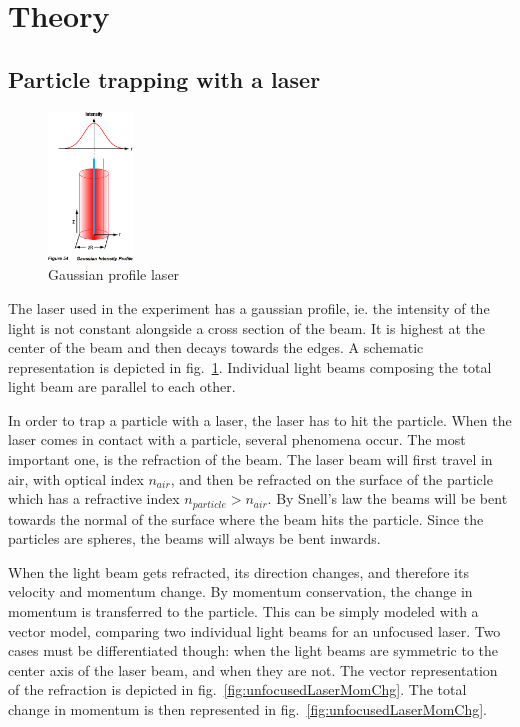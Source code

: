 \documentclass{article}
\begin{document}
\section{Theory}

\subsection{Particle trapping with a laser}

\begin{figure}
    \centering
    \includegraphics[width=0.2\textwidth]{gaussianLaser.png}
    \caption{Gaussian profile laser}
    \label{fig:gaussianLaser}
\end{figure}

The laser used in the experiment has a gaussian profile, ie. the intensity of the light is not constant alongside a cross section of the beam. It is highest at the center of the beam and then decays towards the edges. A schematic representation is depicted in fig.~\ref{fig:gaussianLaser}. Individual light beams composing the total light beam are parallel to each other. \medskip

In order to trap a particle with a laser, the laser has to hit the particle. When the laser comes in contact with a particle, several phenomena occur. The most important one, is the refraction of the beam. The laser beam will first travel in air, with optical index $n_{air}$, and then be refracted on the surface of the particle which has a refractive index $n_{particle}>n_{air}$. By Snell's law the beams will be bent towards the normal of the surface where the beam hits the particle. Since the particles are spheres, the beams will always be bent inwards. \medskip

When the light beam gets refracted, its direction changes, and therefore its velocity and momentum change. By momentum conservation, the change in momentum is transferred to the particle. This can be simply modeled with a vector model, comparing two individual light beams for an unfocused laser. Two cases must be differentiated though: when the light beams are symmetric to the center axis of the laser beam, and when they are not. The vector representation of the refraction is depicted in fig.~\ref{fig:unfocusedLaserMomChg}. The total change in momentum is then represented in fig.~\ref{fig:unfocusedLaserMomChg}.
\end{document}
